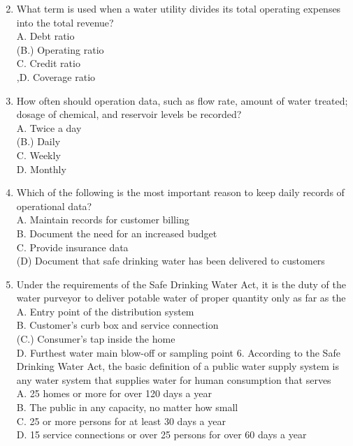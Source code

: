 \documentclass[10pt]{article}
\begin{document}
\begin{enumerate}
  \setcounter{enumi}{1}
  \item What term is used when a water utility divides its total operating expenses into the total revenue?\\
A. Debt ratio\\
(B.) Operating ratio\\
C. Credit ratio\\
,D. Coverage ratio

  \item How often should operation data, such as flow rate, amount of water treated; dosage of chemical, and reservoir levels be recorded?\\
A. Twice a day\\
(B.) Daily\\
C. Weekly\\
D. Monthly

  \item Which of the following is the most important reason to keep daily records of operational data?\\
A. Maintain records for customer billing\\
B. Document the need for an increased budget\\
C. Provide insurance data\\
(D) Document that safe drinking water has been delivered to customers

  \item Under the requirements of the Safe Drinking Water Act, it is the duty of the water purveyor to deliver potable water of proper quantity only as far as the\\
A. Entry point of the distribution system\\
B. Customer's curb box and service connection\\
(C.) Consumer's tap inside the home\\
D. Furthest water main blow-off or sampling point 6. According to the Safe Drinking Water Act, the basic definition of a public water supply system is any water system that supplies water for human consumption that serves\\
A. 25 homes or more for over 120 days a year\\
B. The public in any capacity, no matter how small\\
C. 25 or more persons for at least 30 days a year\\
D. 15 service connections or over 25 persons for over 60 days a year


\end{enumerate}
\end{document}
